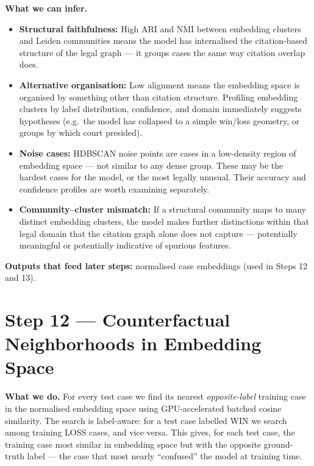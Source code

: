 \documentclass[11pt,a4paper]{article}
\begin{document}
\textbf{What we can infer.}
\begin{itemize}
  \item \textbf{Structural faithfulness:} High ARI and NMI between embedding clusters
    and Leiden communities means the model has internalised the citation-based structure
    of the legal graph --- it groups cases the same way citation overlap does.
  \item \textbf{Alternative organisation:} Low alignment means the embedding space is
    organised by something other than citation structure. Profiling embedding clusters
    by label distribution, confidence, and domain immediately suggests hypotheses
    (e.g.\ the model has collapsed to a simple win/loss geometry, or groups by which
    court presided).
  \item \textbf{Noise cases:} HDBSCAN noise points are cases in a low-density region
    of embedding space --- not similar to any dense group. These may be the hardest
    cases for the model, or the most legally unusual. Their accuracy and confidence
    profiles are worth examining separately.
  \item \textbf{Community--cluster mismatch:} If a structural community maps to many
    distinct embedding clusters, the model makes further distinctions within that legal
    domain that the citation graph alone does not capture --- potentially meaningful
    or potentially indicative of spurious features.
\end{itemize}

\textbf{Outputs that feed later steps:} normalised case embeddings (used in Steps
12 and 13).

\bigskip

\section{Step 12 \texorpdfstring{\textcolor{stepgray}{---}}{---} Counterfactual Neighborhoods in Embedding Space}

\textbf{What we do.}
For every test case we find its nearest \emph{opposite-label} training case in the
normalised embedding space using GPU-accelerated batched cosine similarity. The search
is label-aware: for a test case labelled WIN we search among training LOSS cases, and
vice versa. This gives, for each test case, the training case most similar in
embedding space but with the opposite ground-truth label --- the case that most nearly
``confused'' the model at training time.
\end{document}
